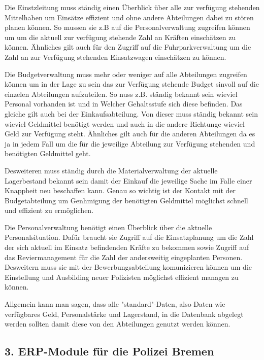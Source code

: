 \documentclass[12pt,utf8]{scrartcl}
\begin{document}
Die Einstzleitung muss ständig einen Überblick über alle zur verfügung stehenden Mittelhaben um Einsätze effizient und ohne andere Abteilungen dabei zu stören planen können. So mussen sie z.B auf die Personalverwaltung zugreifen können um um die aktuell zur verfügung stehende Zahl an Kräften einschätzen zu können. Ähnliches gilt auch für den Zugriff auf die Fuhrparkverwaltung um die Zahl an zur Verfügung stehenden Einsatzwagen einschätzen zu können.

Die Budgetverwaltung muss mehr oder weniger auf alle Abteilungen zugreifen können um in der Lage zu sein das zur Verfügung stehende Budget sinvoll auf die einzelen Abteilungen aufzuteilen. So nuss z.B. ständig bekannt sein wieviel Personal vorhanden ist und in Welcher Gehaltsstufe sich diese befinden. Das gleiche gilt auch bei der Einkaufsabteilung. Von dieser muss ständig bekannt sein wieviel Geldmittel benötigt werden und auch in die andere Richtunge wieviel Geld zur Verfügung steht. Ähnliches gilt auch für die anderen Abteilungen da es ja in jedem Fall um die für die jeweilige Abteilung zur Verfügung stehenden und benötigten Geldmittel geht.

Desweiteren muss ständig durch die Materialverwaltung der aktuelle Lagerbestand bekannt sein damit der Einkauf die jeweilige Sache im Falle einer Knappheit neu beschaffen kann. Genau so wichtig ist der Kontakt mit der Budgetabteilung um Genhmigung der benötigten Geldmittel möglichst schnell und effizient zu ermöglichen.

Die Personalverwaltung benötigt einen Überblick über die aktuelle Personalsituation. Dafür braucht sie Zugriff auf die Einsatzplanung um die Zahl der sich aktuell im Einsatz befindenden Kräfte zu bekommen sowie Zugriff auf das Reviermanagement für die Zahl der andersweitig eingeplanten Personen. Desweitern muss sie mit der Bewerbungsabteilung komunizieren können um die Einstellung und Ausbilding neuer Polizisten möglichst effizient managen zu können.

Allgemein kann man sagen, dass alle "standard"-Daten, also Daten wie verfügbares Geld, Personalstärke und Lagerstand, in die Datenbank abgelegt werden sollten damit diese von den Abteilungen genutzt werden können. 




\subsection*{\label{Aufgabe 2.1.3}3. ERP-Module für die Polizei Bremen}
\end{document}
